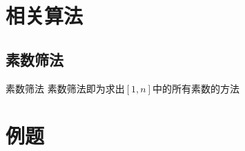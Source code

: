 





\section*{相关算法}
\label{prime:sec:prime-algo}




\subsection*{素数筛法}
\label{prime:algo:prime-seive}

\begin{frame}{素数筛法}
	素数筛法即为求出\([1,n]\)中的所有素数的方法
\end{frame}





\section*{例题}
\label{prime:sec:prime-example}


